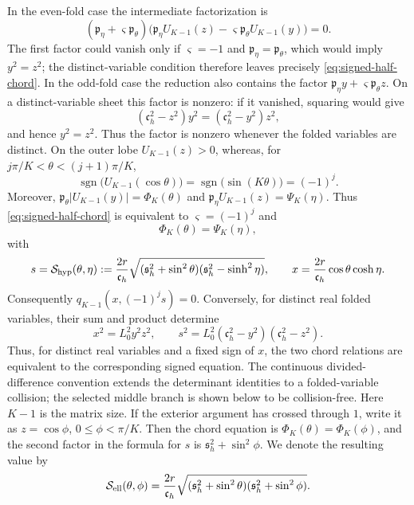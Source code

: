 \documentclass[11pt,a4paper]{article}
\numberwithin{equation}{section}
\begin{document}
In the even-fold case the intermediate factorization is
\[
 (\mathfrak p_\eta+\varsigma\mathfrak p_\theta)
 \bigl(\mathfrak p_\eta U_{K-1}(z)
 -\varsigma\mathfrak p_\theta U_{K-1}(y)\bigr)=0.
\]
The first factor could vanish only if \(\varsigma=-1\) and
\(\mathfrak p_\eta=\mathfrak p_\theta\), which would imply
\(y^2=z^2\); the distinct-variable condition therefore leaves precisely
\eqref{eq:signed-half-chord}.  In the odd-fold case the reduction also
contains the factor
\(\mathfrak p_\eta y+\varsigma\mathfrak p_\theta z\).  On a
distinct-variable sheet this factor is nonzero: if it vanished, squaring
would give
\[
 (\mathfrak c_h^2-z^2)y^2=(\mathfrak c_h^2-y^2)z^2,
\]
and hence \(y^2=z^2\).  Thus the factor is nonzero whenever the folded
variables are distinct.  On the outer lobe
\(U_{K-1}(z)>0\), whereas, for
\(j\pi/K<\theta<(j+1)\pi/K\),
\[
 \operatorname{sgn}\bigl(U_{K-1}(\cos\theta)\bigr)
 =\operatorname{sgn}\bigl(\sin(K\theta)\bigr)=(-1)^j.
\]
Moreover,
\(\mathfrak p_\theta|U_{K-1}(y)|=\Phi_K(\theta)\) and
\(\mathfrak p_\eta U_{K-1}(z)=\Psi_K(\eta)\).  Thus
\eqref{eq:signed-half-chord} is equivalent to
\(\varsigma=(-1)^j\) and
\begin{equation}\label{eq:chord-equation}
 \Phi_K(\theta)=\Psi_K(\eta),
\end{equation}
with
\begin{equation}\label{eq:channel-xs}
 s=\mathcal S_{\rm hyp}(\theta,\eta)
 :=\frac{2r}{\mathfrak c_h}
 \sqrt{(\mathfrak s_h^2+\sin^2\theta)
       (\mathfrak s_h^2-\sinh^2\eta)},\qquad
 x=\frac{2r}{\mathfrak c_h}\cos\theta\cosh\eta.
\end{equation}
Consequently \(q_{K-1}(x,(-1)^j s)=0\).  Conversely, for distinct real
folded variables, their sum and product determine
\[
 x^2=L_0^2y^2z^2,\qquad
 s^2=L_0^2(\mathfrak c_h^2-y^2)(\mathfrak c_h^2-z^2).
\]
Thus, for distinct real variables and a fixed sign of \(x\), the two chord
relations are equivalent to the corresponding signed equation.  The
continuous divided-difference convention extends the determinant identities
to a folded-variable collision; the selected middle branch is shown below to
be collision-free.
Here \(K-1\) is the matrix size.  If the exterior argument has crossed
through \(1\), write it as \(z=\cos\phi\),
\(0\leq\phi<\pi/K\).  Then the chord equation is
\(\Phi_K(\theta)=\Phi_K(\phi)\), and the second factor in the formula
for \(s\) is \(\mathfrak s_h^2+\sin^2\phi\).  We denote the resulting
value by
\[
 \mathcal S_{\rm ell}(\theta,\phi)
 =\frac{2r}{\mathfrak c_h}
 \sqrt{(\mathfrak s_h^2+\sin^2\theta)
       (\mathfrak s_h^2+\sin^2\phi)}.
\]
\end{document}
